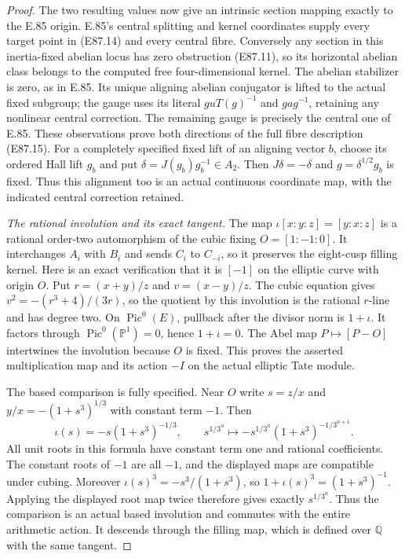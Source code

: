 \begin{proof}
The two resulting values now give an
intrinsic section mapping exactly to the
E.85 origin. E.85's central splitting and
kernel coordinates supply every target
point in (E87.14) and every central fibre.
Conversely any section in this inertia-fixed
abelian locus has zero obstruction (E87.11),
so its horizontal abelian class belongs to
the computed free four-dimensional kernel.
The abelian stabilizer is zero, as in E.85.
Its unique aligning abelian conjugator is
lifted to the actual fixed subgroup; the
gauge uses its literal $g u T(g)^{-1}$ and
$gag^{-1}$, retaining any nonlinear central
correction. The remaining gauge is precisely
the central one of E.85. These observations
prove both directions of the full fibre
description (E87.15).
For a completely specified fixed lift of
an aligning vector $b$, choose its ordered
Hall lift $g_b$ and put
$\delta=J(g_b)g_b^{-1}\in A_2$.
Then $J\delta=-\delta$ and
$g=\delta^{1/2}g_b$ is fixed. Thus this
alignment too is an actual continuous
coordinate map, with the indicated
central correction retained.

\emph{The rational involution and its exact tangent.}
The map $\iota[x:y:z]=[y:x:z]$ is a rational
order-two automorphism of the cubic fixing
$O=[1:-1:0]$. It interchanges $A_i$ with
$B_i$ and sends $C_i$ to $C_{-i}$, so it
preserves the eight-cusp filling kernel.
Here is an exact verification that it
is $[-1]$ on the elliptic curve with
origin $O$. Put $r=(x+y)/z$ and
$v=(x-y)/z$. The cubic equation gives
$v^2=-(r^3+4)/(3r)$, so the quotient
by this involution is the rational
$r$-line and has degree two. On
$\operatorname{Pic}^0(E)$, pullback
after the divisor norm is $1+\iota$.
It factors through
$\operatorname{Pic}^0(\mathbb P^1)=0$,
hence $1+\iota=0$. The Abel map
$P\mapsto[P-O]$ intertwines the
involution because $O$ is fixed.
This proves the asserted multiplication
map and its action $-I$ on the actual
elliptic Tate module.

The based comparison is fully specified.
Near $O$ write $s=z/x$ and
$y/x=-(1+s^3)^{1/3}$ with constant term
$-1$. Then
\[
 \iota(s)=-s(1+s^3)^{-1/3},\qquad
 s^{1/3^n}\longmapsto
     -s^{1/3^n}(1+s^3)^{-1/3^{n+1}}.
 \tag{E87.34}
\]
All unit roots in this formula have constant
term one and rational coefficients. The
constant roots of $-1$ are all $-1$, and
the displayed maps are compatible under
cubing. Moreover
$\iota(s)^3=-s^3/(1+s^3)$, so
$1+\iota(s)^3=(1+s^3)^{-1}$.
Applying the displayed root map twice
therefore gives exactly $s^{1/3^n}$.
Thus the comparison is an actual based
involution and commutes with the entire
arithmetic action. It descends through the
filling map, which is defined over
$\mathbb Q$ with the same tangent.


\end{proof}
